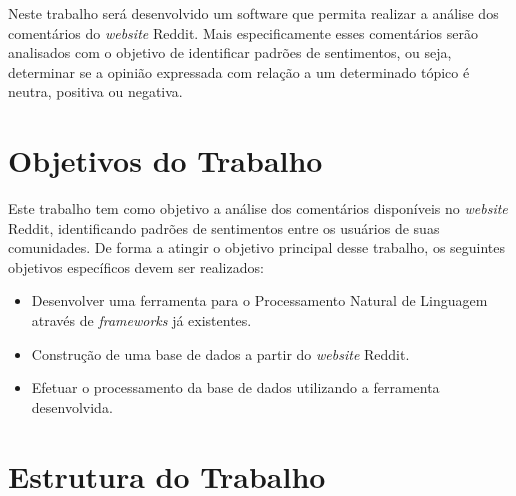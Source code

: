Neste trabalho será desenvolvido um software que permita realizar a
análise dos comentários do \textit{website} Reddit. Mais
especificamente esses comentários serão analisados com o objetivo de identificar padrões de sentimentos, ou seja, determinar se a
opinião expressada com relação a um determinado tópico é neutra, positiva ou negativa.

\section{Objetivos do Trabalho}

Este trabalho tem como objetivo a análise dos comentários disponíveis no
\textit{website} Reddit, identificando padrões de sentimentos entre os
usuários de suas comunidades. De forma a atingir o objetivo principal desse
trabalho, os seguintes objetivos específicos devem ser realizados:
\begin{itemize}
  \item Desenvolver uma ferramenta para o Processamento Natural de Linguagem através de
\textit{frameworks} já existentes.
 \item Construção de uma base de dados a partir do \textit{website} Reddit.
 \item Efetuar o processamento da base de dados utilizando a ferramenta desenvolvida.
\end{itemize}

\section{Estrutura do Trabalho}
